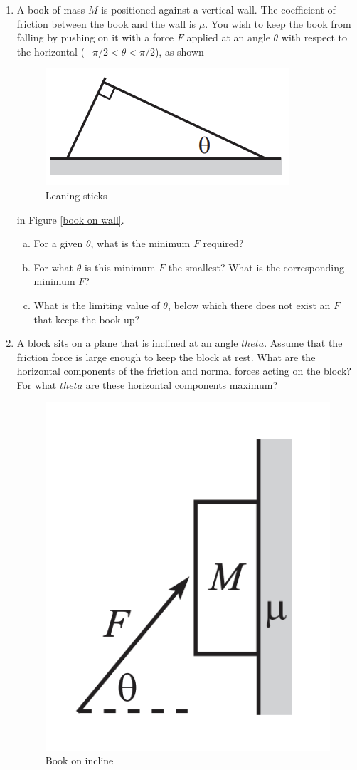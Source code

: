 \documentclass{article}
\begin{document}
\begin{enumerate}
\item A book of mass $M$ is positioned against a vertical wall. The coefficient of friction between the book and the wall is $\mu$. You wish to keep
the book from falling by pushing on it with a force $F$ applied at an angle $\theta$ with respect to the horizontal ($−\pi/2 < \theta < \pi/2$), as shown
\begin{figure}
    \centering
    \includegraphics[width=0.5\linewidth]{leaning sticks.png}
    \caption{Leaning sticks}
    \label{fig:enter-label}
\end{figure}
in Figure \ref{book on wall}.
\begin{enumerate}[a)]
    \item For a given $\theta$, what is the minimum $F$ required?
    \item For what $\theta$ is this minimum $F$ the smallest? What is the corresponding minimum $F$?
    \item What is the limiting value of $\theta$, below which there does not exist an $F$ that keeps the book up?
\end{enumerate}

\item A block sits on a plane that is inclined at an angle $theta$. Assume that
the friction force is large enough to keep the block at rest. What are the
horizontal components of the friction and normal forces acting on the
block? For what $theta$ are these horizontal components maximum?

\begin{figure}
    \centering
    \includegraphics[width=0.5\linewidth]{book on incline.png}
    \caption{Book on incline}
    \label{fig:enter-label}
\end{figure}


\end{enumerate}
\end{document}
